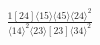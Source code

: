 \documentclass[varwidth, border=5pt]{standalone}
\begin{document}
\begin{my}
$\begin{gathered}
\scriptscriptstyle\frac{1[24]⟨15⟩⟨45⟩⟨24⟩^2}{⟨14⟩^2⟨23⟩[23]⟨34⟩^2}
\end{gathered}$
\end{my}
\end{document}
